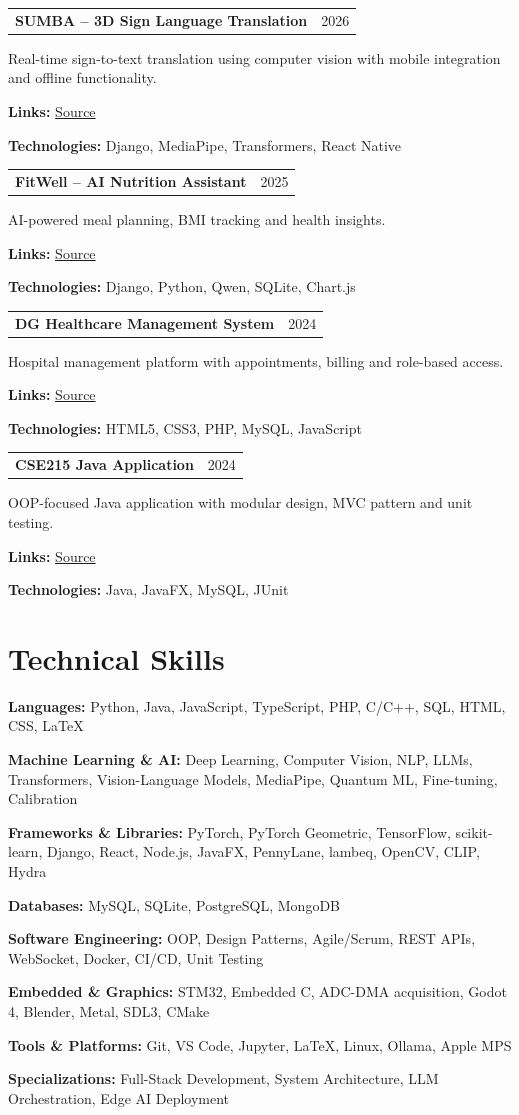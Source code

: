 \documentclass[11pt,letterpaper]{article}
\makeatletter
\newcommand{\entryhead}[2]{\par\vspace{3pt}\noindent%
  \begin{tabular*}{\textwidth}[t]{@{}>{\raggedright\arraybackslash}p{0.73\textwidth}@{\extracolsep{\fill}}r@{}}
    \textbf{#1} & #2
  \end{tabular*}\par\vspace{-1pt}}
\newcommand{\entryplain}[2]{\entryhead{#1}{#2}}
\newcommand{\tech}[1]{\par\vspace{1pt}\noindent\textbf{Technologies:} #1\par}
\newcommand{\links}[1]{\par\vspace{1pt}\noindent\textbf{Links:} #1\par}
\newcommand{\gap}{\par\vspace{3pt}}
\makeatother
\begin{document}
\entryplain{SUMBA -- 3D Sign Language Translation}{2026}
Real-time sign-to-text translation using computer vision with mobile integration and offline
functionality.
\links{\href{https://github.com/minhaz-42/SUMBA}{Source}}
\tech{Django, MediaPipe, Transformers, React Native}
\gap

\entryplain{FitWell -- AI Nutrition Assistant}{2025}
AI-powered meal planning, BMI tracking and health insights.
\links{\href{https://github.com/minhaz-42/FitWell-Using-Django}{Source}}
\tech{Django, Python, Qwen, SQLite, Chart.js}
\gap

\entryplain{DG Healthcare Management System}{2024}
Hospital management platform with appointments, billing and role-based access.
\links{\href{https://github.com/minhaz-42/cse311-project-on---DG-health-care-management-system-using-html-css-php}{Source}}
\tech{HTML5, CSS3, PHP, MySQL, JavaScript}
\gap

\entryplain{CSE215 Java Application}{2024}
OOP-focused Java application with modular design, MVC pattern and unit testing.
\links{\href{https://github.com/minhaz-42/cse215-project-using-java}{Source}}
\tech{Java, JavaFX, MySQL, JUnit}

\section{Technical Skills}
\textbf{Languages:} Python, Java, JavaScript, TypeScript, PHP, C/C++, SQL, HTML, CSS, \LaTeX

\textbf{Machine Learning \& AI:} Deep Learning, Computer Vision, NLP, LLMs, Transformers,
Vision-Language Models, MediaPipe, Quantum ML, Fine-tuning, Calibration

\textbf{Frameworks \& Libraries:} PyTorch, PyTorch Geometric, TensorFlow, scikit-learn, Django,
React, Node.js, JavaFX, PennyLane, lambeq, OpenCV, CLIP, Hydra

\textbf{Databases:} MySQL, SQLite, PostgreSQL, MongoDB

\textbf{Software Engineering:} OOP, Design Patterns, Agile/Scrum, REST APIs, WebSocket, Docker,
CI/CD, Unit Testing

\textbf{Embedded \& Graphics:} STM32, Embedded C, ADC-DMA acquisition, Godot 4, Blender, Metal,
SDL3, CMake

\textbf{Tools \& Platforms:} Git, VS Code, Jupyter, \LaTeX, Linux, Ollama, Apple MPS

\textbf{Specializations:} Full-Stack Development, System Architecture, LLM Orchestration,
Edge AI Deployment
\end{document}
